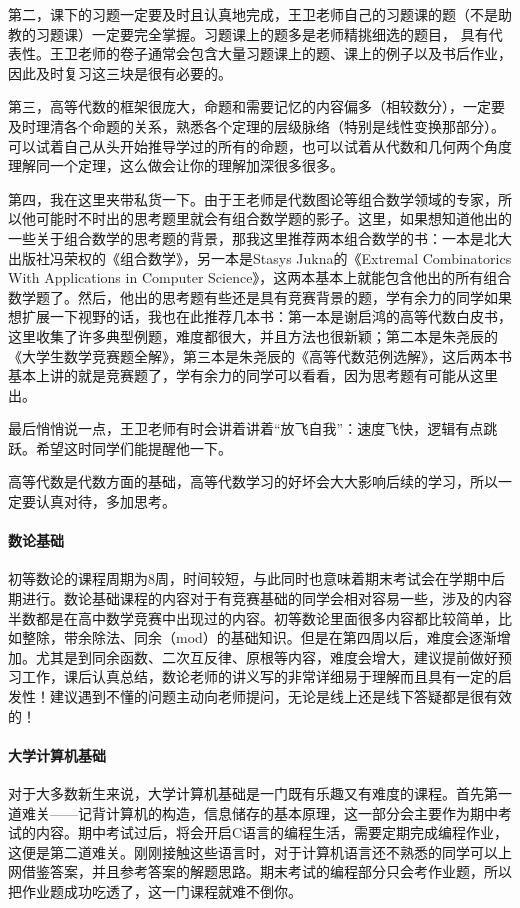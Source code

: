 \documentclass[
decoration,  %
]{qyxf-book}
\begin{document}
第二，课下的习题一定要及时且认真地完成，王卫老师自己的习题课的题（不是助教的习题课）一定要完全掌握。习题课上的题多是老师精挑细选的题目，
具有代表性。王卫老师的卷子通常会包含大量习题课上的题、课上的例子以及书后作业，因此及时复习这三块是很有必要的。

第三，高等代数的框架很庞大，命题和需要记忆的内容偏多（相较数分），一定要及时理清各个命题的关系，熟悉各个定理的层级脉络（特别是线性变换那部分）。可以试着自己从头开始推导学过的所有的命题，也可以试着从代数和几何两个角度理解同一个定理，这么做会让你的理解加深很多很多。

第四，我在这里夹带私货一下。由于王老师是代数图论等组合数学领域的专家，所以他可能时不时出的思考题里就会有组合数学题的影子。这里，如果想知道他出的一些关于组合数学的思考题的背景，那我这里推荐两本组合数学的书：一本是北大出版社冯荣权的《组合数学》，另一本是Stasys Jukna的《Extremal Combinatorics With Applications in Computer Science》，这两本基本上就能包含他出的所有组合数学题了。然后，他出的思考题有些还是具有竞赛背景的题，学有余力的同学如果想扩展一下视野的话，我也在此推荐几本书：第一本是谢启鸿的高等代数白皮书，这里收集了许多典型例题，难度都很大，并且方法也很新颖；第二本是朱尧辰的《大学生数学竞赛题全解》，第三本是朱尧辰的《高等代数范例选解》，这后两本书基本上讲的就是竞赛题了，学有余力的同学可以看看，因为思考题有可能从这里出。

最后悄悄说一点，王卫老师有时会讲着讲着“放飞自我”：速度飞快，逻辑有点跳跃。希望这时同学们能提醒他一下。

高等代数是代数方面的基础，高等代数学习的好坏会大大影响后续的学习，所以一定要认真对待，多加思考。


\paragraph{数论基础}
初等数论的课程周期为8周，时间较短，与此同时也意味着期末考试会在学期中后期进行。数论基础课程的内容对于有竞赛基础的同学会相对容易一些，涉及的内容半数都是在高中数学竞赛中出现过的内容。初等数论里面很多内容都比较简单，比如整除，带余除法、同余（mod）的基础知识。但是在第四周以后，难度会逐渐增加。尤其是到同余函数、二次互反律、原根等内容，难度会增大，建议提前做好预习工作，课后认真总结，数论老师的讲义写的非常详细易于理解而且具有一定的启发性！建议遇到不懂的问题主动向老师提问，无论是线上还是线下答疑都是很有效的！

\paragraph{大学计算机基础}
对于大多数新生来说，大学计算机基础是一门既有乐趣又有难度的课程。首先第一道难关——记背计算机的构造，信息储存的基本原理，这一部分会主要作为期中考试的内容。期中考试过后，将会开启C语言的编程生活，需要定期完成编程作业，这便是第二道难关。刚刚接触这些语言时，对于计算机语言还不熟悉的同学可以上网借鉴答案，并且参考答案的解题思路。期末考试的编程部分只会考作业题，所以把作业题成功吃透了，这一门课程就难不倒你。
\end{document}
